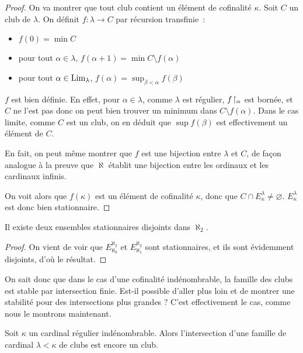 \begin{proof}
  On va montrer que tout club contient un élément de cofinalité $\kappa$. Soit
  $C$ un club de $\lambda$. On définit $f : \lambda \to C$ par récursion
  transfinie~:
  \begin{itemize}
  \item $f(0) = \min C$
  \item pour tout $\alpha \in \lambda$,
    $f(\alpha + 1) = \min C\setminus f(\alpha)$
  \item pour tout $\alpha \in \operatorname{Lim}_\lambda$,
    $f(\alpha) = \sup_{\beta < \alpha} f(\beta)$
  \end{itemize}

  $f$ est bien définie. En effet, pour $\alpha \in \lambda$, comme $\lambda$ est
  régulier, $f\!\upharpoonright_{\alpha}$ est bornée, et $C$ ne l'est pas donc on peut bien
  trouver un minimum dans $C\setminus f(\alpha)$. Dans le cas limite, comme $C$
  est un club, on en déduit que $\sup f(\beta)$ est effectivement un élément de
  $C$.

  En fait, on peut même montrer que $f$ est une bijection entre $\lambda$ et
  $C$, de façon analogue à la preuve que $\aleph$ établit une bijection entre
  les ordinaux et les cardinaux infinis.

  On voit alors que $f(\kappa)$ est un élément de cofinalité $\kappa$, donc que
  $C\cap E_\kappa^\lambda \neq \varnothing$. $E_\kappa^\lambda$ est donc bien
  stationnaire.
\end{proof}

\begin{corollary}\label{cor.al2.deuxdis}
  Il existe deux ensembles stationnaires disjoints dans $\aleph_2$.
\end{corollary}

\begin{proof}
  On vient de voir que $E_{\aleph_0}^{\aleph_2}$ et $E_{\aleph_1}^{\aleph_2}$ sont
  stationnaires, et ils sont évidemment disjoints, d'où le résultat.
\end{proof}

On sait donc que dans le cas d'une cofinalité indénombrable, la famille des
clubs est stable par intersection finie. Est-il possible d'aller plus loin et de
montrer une stabilité pour des intersections plus grandes ? C'est effectivement
le cas, comme nous le montrons maintenant.

\begin{proposition}\label{prop.inter.club.k}
  Soit $\kappa$ un cardinal régulier indénombrable. Alors l'intersection d'une
  famille de cardinal $\lambda < \kappa$ de clubs est encore un club.
\end{proposition}

